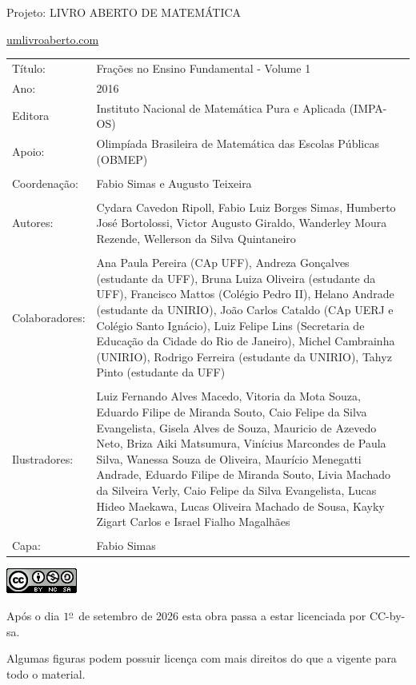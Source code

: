 

\thispagestyle{empty}

\vspace{2cm}
\begin{center}
Projeto: LIVRO ABERTO DE MATEMÁTICA

\url{umlivroaberto.com}
\vspace{2cm}

\begin{tabular}{p{}p{}}
Título: & Frações no Ensino Fundamental - Volume 1\\
Ano: & 2016 \\
Editora & Instituto Nacional de Matem\'atica Pura e Aplicada (IMPA-OS)\\
Apoio:& Olimp\'iada Brasileira de Matem\'atica das Escolas P\'ublicas (OBMEP)\\
\\
Coordenação: & Fabio Simas e Augusto Teixeira\\
\\
Autores: & Cydara Cavedon Ripoll, Fabio Luiz Borges Simas, Humberto José Bortolossi, Victor Augusto Giraldo, Wanderley Moura Rezende, Wellerson  da Silva Quintaneiro\\
\\
Colaboradores: & Ana Paula Pereira (CAp UFF), Andreza Gonçalves (estudante da UFF), Bruna Luiza Oliveira (estudante da UFF), Francisco Mattos (Colégio Pedro II), Helano Andrade (estudante da UNIRIO), João Carlos Cataldo (CAp UERJ e Colégio Santo Ignácio), Luiz Felipe Lins (Secretaria de Educação da Cidade do Rio de Janeiro), Michel Cambrainha (UNIRIO), Rodrigo Ferreira (estudante da UNIRIO), Tahyz Pinto (estudante da UFF) \\
\\
Ilustradores: & Luiz Fernando Alves Macedo,
Vitoria da Mota Souza,
Eduardo Filipe de Miranda Souto,
Caio Felipe da Silva Evangelista,
Gisela Alves de Souza,
Mauricio de Azevedo Neto,
Briza Aiki Matsumura,
Vinícius Marcondes de Paula Silva,
Wanessa Souza de Oliveira,
Maurício Menegatti Andrade,
Eduardo Filipe de Miranda Souto,
Livia Machado da Silveira Verly,
Caio Felipe da Silva Evangelista,
Lucas Hideo Maekawa,
Lucas Oliveira Machado de Sousa,
Kayky Zigart Carlos e
Israel Fialho Magalhães\\
\\
Capa: & Fabio Simas
\end{tabular}
\vspace{5cm}
 
\includegraphics[scale=1]{cc}

Após o dia $1^{\textrm{\underline{o}}}$ de setembro de 2026 esta obra passa a estar licenciada por CC-by-sa.

Algumas figuras podem possuir licença com mais direitos do que a vigente para todo o material.
\end{center}
